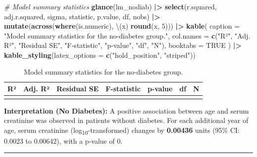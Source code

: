 \documentclass[
  12pt,
]{article}
\newenvironment{Shaded}{\begin{snugshade}}{\end{snugshade}}
\newcommand{\AttributeTok}[1]{\textcolor[rgb]{0.13,0.29,0.53}{#1}}
\newcommand{\CommentTok}[1]{\textcolor[rgb]{0.56,0.35,0.01}{\textit{#1}}}
\newcommand{\ConstantTok}[1]{\textcolor[rgb]{0.56,0.35,0.01}{#1}}
\newcommand{\DecValTok}[1]{\textcolor[rgb]{0.00,0.00,0.81}{#1}}
\newcommand{\FunctionTok}[1]{\textcolor[rgb]{0.13,0.29,0.53}{\textbf{#1}}}
\newcommand{\NormalTok}[1]{#1}
\newcommand{\SpecialCharTok}[1]{\textcolor[rgb]{0.81,0.36,0.00}{\textbf{#1}}}
\newcommand{\StringTok}[1]{\textcolor[rgb]{0.31,0.60,0.02}{#1}}
\begin{document}
\begin{Shaded}
\begin{Highlighting}[]
\CommentTok{\# Model summary statistics}
\FunctionTok{glance}\NormalTok{(lm\_nodiab) }\SpecialCharTok{|\textgreater{}}
  \FunctionTok{select}\NormalTok{(r.squared, adj.r.squared, sigma, statistic, p.value, df, nobs) }\SpecialCharTok{|\textgreater{}}
  \FunctionTok{mutate}\NormalTok{(}\FunctionTok{across}\NormalTok{(}\FunctionTok{where}\NormalTok{(is.numeric), \textbackslash{}(x) }\FunctionTok{round}\NormalTok{(x, }\DecValTok{5}\NormalTok{))) }\SpecialCharTok{|\textgreater{}}
  \FunctionTok{kable}\NormalTok{(}
    \AttributeTok{caption   =} \StringTok{"Model summary statistics for the no{-}diabetes group."}\NormalTok{,}
    \AttributeTok{col.names =} \FunctionTok{c}\NormalTok{(}\StringTok{"R²"}\NormalTok{, }\StringTok{"Adj. R²"}\NormalTok{, }\StringTok{"Residual SE"}\NormalTok{, }\StringTok{"F{-}statistic"}\NormalTok{, }\StringTok{"p{-}value"}\NormalTok{, }\StringTok{"df"}\NormalTok{, }\StringTok{"N"}\NormalTok{),}
    \AttributeTok{booktabs  =} \ConstantTok{TRUE}
\NormalTok{  ) }\SpecialCharTok{|\textgreater{}}
  \FunctionTok{kable\_styling}\NormalTok{(}\AttributeTok{latex\_options =} \FunctionTok{c}\NormalTok{(}\StringTok{"hold\_position"}\NormalTok{, }\StringTok{"striped"}\NormalTok{))}
\end{Highlighting}
\end{Shaded}

\begin{longtable}[t]{rrrrrrr}
\caption{\label{tab:task-g-lm-nodiabetes}Model summary statistics for the no-diabetes group.}\\
\toprule
R² & Adj. R² & Residual SE & F-statistic & p-value & df & N\\
\midrule
\cellcolor{gray!10}{0.09384} & \cellcolor{gray!10}{0.08848} & \cellcolor{gray!10}{0.17309} & \cellcolor{gray!10}{17.50214} & \cellcolor{gray!10}{5e-05} & \cellcolor{gray!10}{1} & \cellcolor{gray!10}{171}\\
\bottomrule
\end{longtable}

\textbf{Interpretation (No Diabetes):} A positive association between
age and serum creatinine was observed in patients without diabetes. For
each additional year of age, serum creatinine
(log\textsubscript{10}-transformed) changes by \textbf{0.00436} units
(95\% CI: 0.0023 to 0.00642), with a p-value of 0.

\begin{center}\rule{0.5\linewidth}{0.5pt}\end{center}
\end{document}
